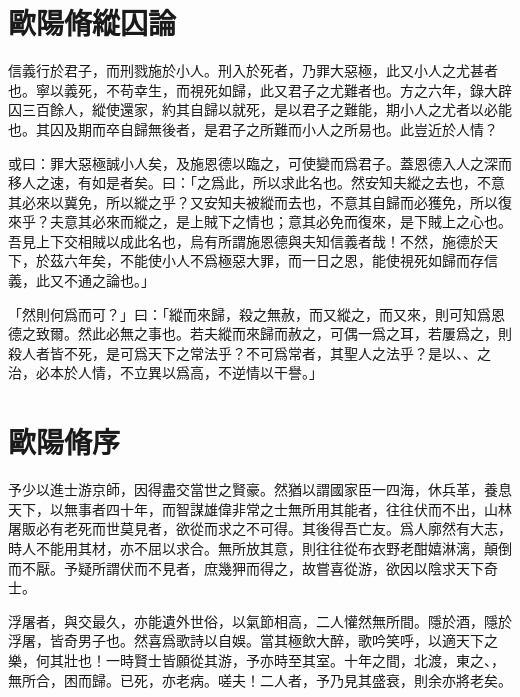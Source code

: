 \theendnotes

\section[縱囚論\quad{\small 歐陽脩}]{{\normalsize 歐陽脩}\quad 縱囚論}
信義行於君子，而刑戮施於小人。刑入於死者，乃罪大惡極，此又小人之尤甚者也。寧以義死，不苟幸生，而視死如歸，此又君子之尤難者也。方之六年，錄大辟囚三百餘人，縱使還家，約其自歸以就死，是以君子之難能，期小人之尤者以必能也。其囚及期而卒自歸無後者，是君子之所難而小人之所易也。此豈近於人情？

或曰：罪大惡極誠小人矣，及施恩德以臨之，可使變而爲君子。蓋恩德入人之深而移人之速，有如是者矣。曰：「之爲此，所以求此名也。然安知夫縱之去也，不意其必來以冀免，所以縱之乎？又安知夫被縱而去也，不意其自歸而必獲免，所以復來乎？夫意其必來而縱之，是上賊下之情也；意其必免而復來，是下賊上之心也。吾見上下交相賊以成此名也，烏有所謂施恩德與夫知信義者哉！不然，施德於天下，於茲六年矣，不能使小人不爲極惡大罪，而一日之恩，能使視死如歸而存信義，此又不通之論也。」

「然則何爲而可？」曰：「縱而來歸，殺之無赦，而又縱之，而又來，則可知爲恩德之致爾。然此必無之事也。若夫縱而來歸而赦之，可偶一爲之耳，若屢爲之，則殺人者皆不死，是可爲天下之常法乎？不可爲常者，其聖人之法乎？是以、、之治，必本於人情，不立異以爲高，不逆情以干譽。」

\section[釋祕演詩集序\quad{\small 歐陽脩}]{{\normalsize 歐陽脩}\quad {}序}
予少以進士游京師，因得盡交當世之賢豪。然猶以謂國家臣一四海，休兵革，養息天下，以無事者四十年，而智謀雄偉非常之士無所用其能者，往往伏而不出，山林屠販必有老死而世莫見者，欲從而求之不可得。其後得吾亡友。爲人廓然有大志，時人不能用其材，亦不屈以求合。無所放其意，則往往從布衣野老酣嬉淋漓，顛倒而不厭。予疑所謂伏而不見者，庶幾狎而得之，故嘗喜從游，欲因以陰求天下奇士。

浮屠者，與交最久，亦能遺外世俗，以氣節{相}高，二人懽然無所間。隱於酒，隱於浮屠，皆奇男子也。然喜爲歌詩以自娛。當其極飲大醉，歌吟笑呼，以適天下之樂，何其壯也！一時賢士皆願從其游，予亦時至其室。十年之間，北渡，東之、，無所合，困而歸。已死，亦老病。嗟夫！二人者，予乃見其盛衰，則{余}亦將老矣。%

